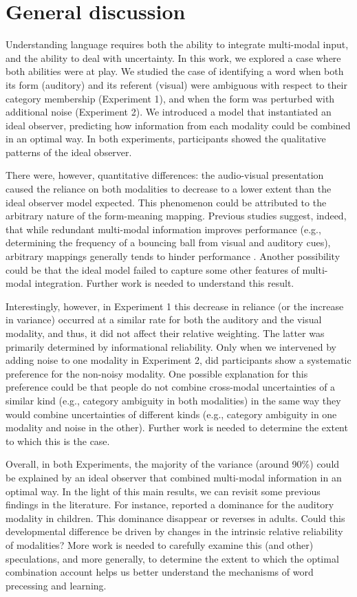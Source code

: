\documentclass[10pt,letterpaper]{article}
\begin{document}
\section{General discussion}

Understanding language requires both the ability to integrate multi-modal input, and the ability to deal with uncertainty. In this work, we explored a case where both abilities were at play. We studied the case of identifying a word when both its form (auditory) and its referent (visual) were ambiguous with respect to their category membership (Experiment 1), and when the form was perturbed with additional noise (Experiment 2). We introduced a model that instantiated an ideal observer, predicting how information from each modality could be combined in an optimal way. In both experiments, participants showed the qualitative patterns of the ideal observer. 

There were, however, quantitative differences: the audio-visual presentation caused the reliance on both modalities to decrease to a lower extent than the ideal observer model expected. This phenomenon could be attributed to the arbitrary nature of the form-meaning mapping. Previous studies suggest, indeed, that while redundant multi-modal information improves performance (e.g., determining the frequency of a bouncing ball from visual and auditory cues), arbitrary mappings generally tends to hinder performance \cite<for review, see>{robinson2010}. Another possibility could be that the ideal model failed to capture some other features of multi-modal integration. Further work is needed to understand this result. 

Interestingly, however, in Experiment 1 this decrease in reliance (or the increase in variance) occurred at a similar rate for both the auditory and the visual modality, and thus, it did not affect their relative weighting. The latter was primarily determined by informational reliability. Only when we intervened by adding  noise to one modality in Experiment 2, did participants show a systematic preference for the non-noisy modality. One possible explanation for this preference could be that people do not combine cross-modal uncertainties of a similar kind (e.g., category ambiguity in both modalities) in the same way they would combine uncertainties of different kinds (e.g., category ambiguity in one modality and noise in the other). Further work is needed to determine the extent to which this is the case.

Overall, in both Experiments, the majority of the variance (around 90\%) could be explained by an ideal observer that combined multi-modal information in an optimal way. In the light of this main results, we can revisit some previous findings in the literature. For instance,  reported a dominance for the auditory modality in children. This dominance disappear or reverses in adults. Could this developmental difference be driven by changes in the intrinsic relative reliability of modalities? More work is needed to carefully examine this (and other) speculations, and more generally, to determine the extent to which the optimal combination account helps us better understand the mechanisms of word precessing and learning. 
\end{document}
